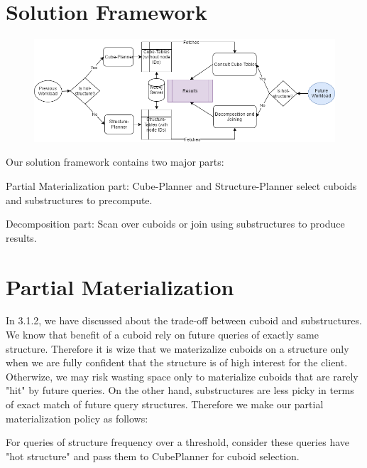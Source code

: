 




\section{Solution Framework}

\begin {figure}[H]
\centering
\includegraphics[scale=0.6]{pic/41.png}
\end{figure}

Our solution framework contains two major parts:

Partial Materialization part: Cube-Planner and Structure-Planner select cuboids and substructures to precompute.

Decomposition part: Scan over cuboids or join using substructures to produce results. 



\section{Partial Materialization}


In 3.1.2, we have discussed about the trade-off between cuboid and substructures. We know that benefit of a cuboid rely on future queries of exactly same structure. Therefore it is wize that we materizalize cuboids on a structure only when we are fully confident that the structure is of high interest for the client. Otherwize, we may risk wasting space only to materialize cuboids that are rarely "hit" by future queries. On the other hand, substructures are less picky in terms of exact match of future query structures. Therefore we make our partial materialization policy as follows: 

For queries of structure frequency over a threshold, consider these queries have "hot structure" and pass them to CubePlanner for cuboid selection. 

